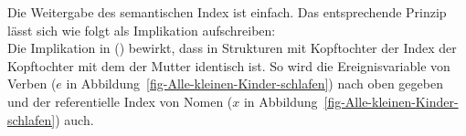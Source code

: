 Die Weitergabe des semantischen Index ist einfach. Das entsprechende Prinzip lässt sich wie folgt als Implikation
aufschreiben:
\ea
\label{Semantik-Index-headed-phrase}
 \impl\\[1pt]
\z
Die Implikation in () bewirkt, dass in Strukturen mit Kopftochter der Index der Kopftochter mit
dem der Mutter identisch ist. So wird die Ereignisvariable von Verben ($e$ in Abbildung~\ref{fig-Alle-kleinen-Kinder-schlafen}) nach oben gegeben und der
referentielle Index von Nomen ($x$ in Abbildung~\ref{fig-Alle-kleinen-Kinder-schlafen}) auch.

